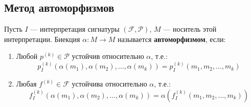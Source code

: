 \subsection{Метод автоморфизмов}

\begin{conj}
    Пусть $I$ --- интерпретация сигнатуры $(\mathcal{F}, \mathcal{P})$, $M$ --- носитель этой интерпретации. Биекция $\alpha : M \to M$ называется \textbf{автоморфизмом}, если:
    \begin{enumerate}
        \item Любой $p^{(k)} \in \mathcal{P}$ устойчив относительно $\alpha$, т.е.:
        $$ p^{(k)}_{I} (\alpha(m_1), \alpha(m_2), \dots, \alpha(m_k)) = p^{(k)}_{I}(m_1, m_2, \dots, m_k)$$
        \item Любая $f^{(k)} \in \mathcal{F}$ устойчива относительно $\alpha$, т.е.:
        $$ f^{(k)}_I (\alpha(m_1), \alpha(m_2), \dots, \alpha(m_k)) = \alpha(f^{(k)}_I(m_1, m_2 , \dots, m_k))$$
    \end{enumerate} 
\end{conj}

